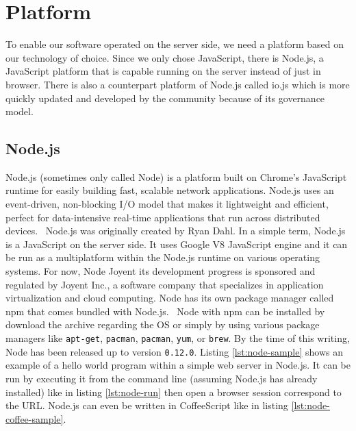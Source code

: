 \section{Platform}
\label{sec:platform}

To enable our software operated on the server side, we need a platform based on our technology of choice.
Since we only chose JavaScript, there is Node.js, a JavaScript platform that is capable running on the server instead of just in browser.
There is also a counterpart platform of Node.js called io.js which is more quickly updated and developed by the community because of its governance model.

\subsection{Node.js}

Node.js\textsuperscript{\textregistered} (sometimes only called Node) is
a platform built on Chrome's JavaScript runtime for easily building fast, scalable network applications.
Node.js uses an event-driven, non-blocking I/O model that makes it lightweight and efficient, perfect for data-intensive real-time applications that run across distributed devices.~\autocite{Joyent:2015:Node}
Node.js was originally created by Ryan Dahl.
In a simple term, Node.js is a JavaScript on the server side.
It uses Google V8 JavaScript engine and it can be run as a multiplatform within the Node.js runtime on various operating systems.
For now, Node Joyent its development progress is sponsored and regulated by Joyent Inc., a software company that specializes in application virtualization and cloud computing.
Node has its own package manager called \ac{npm} that comes bundled with Node.js.~\autocite{Vincent:2014:npm}
Node with npm can be installed by download the archive regarding the \ac{OS} or simply by using various package managers like \verb|apt-get|, \verb|pacman|, \verb|pacman|, \verb|yum|, or \verb|brew|.
By the time of this writing, Node has been released up to version \verb|0.12.0|.
Listing \autoref{lst:node-sample} shows an example of a hello world program within a simple web server in Node.js.
It can be run by executing it from the command line (assuming Node.js has already installed) like in listing \autoref{lst:node-run} then open a browser session correspond to the \ac{URL}.
Node.js can even be written in CoffeeScript like in listing \autoref{lst:node-coffee-sample}.

